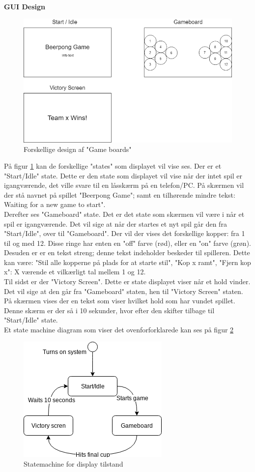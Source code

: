 \documentclass[Softwaredesign/Softwaredesign_main.tex]{subfiles}
\begin{document}
\textbf{GUI Design}
\begin{figure}[H]
    \centering
    \includegraphics[scale=0.5]{Softwaredesign/GUI/Pictures/Boards.png}
    \caption{Forskellige design af "Game boards"}
    \label{gameboards}
\end{figure}

På figur \ref{gameboards} kan de forskellige "states" som displayet vil vise ses. Der er et "Start/Idle" state. Dette er den state som displayet vil vise når der intet spil er igangværende, det ville svare til en låsskærm på en telefon/PC. På skærmen vil der stå navnet på spillet "Beerpong Game"; samt en tilhørende mindre tekst: Waiting for a new game to start". 
\\Derefter ses "Gameboard" state. Det er det state som skærmen vil være i når et spil er igangværende. Det vil sige at når der startes et nyt spil går den fra "Start/Idle", over til "Gameboard". Der vil der vises det forskellige kopper: fra 1 til og med 12. Disse ringe har enten en "off" farve (rød), eller en "on" farve (grøn). Desuden er er en tekst streng; denne tekst indeholder beskeder til spilleren. Dette kan være: "Stil alle kopperne på plads for at starte stil", "Kop x ramt", "Fjern kop x": X værende et vilkærligt tal mellem 1 og 12. 
\\ 
Til sidst er der "Victory Screen". Dette er state displayet viser når et hold vinder. Det vil sige at den går fra "Gameboard" staten, hen til "Victory Screen" staten. På skærmen vises der en tekst som viser hvilket hold som har vundet spillet. Denne skærm er der så i 10 sekunder, hvor efter den skifter tilbage til "Start/Idle" state.  
\\
Et state machine diagram som viser det ovenforforklarede kan ses på figur \ref{GuiDisplayStatemachine}

\begin{figure}[H]
    \centering
    \includegraphics{Softwaredesign/GUI/Pictures/GuiDisplayStatemachine.png}
    \caption{Statemachine for display tilstand}
    \label{GuiDisplayStatemachine}
\end{figure}
\end{document}
